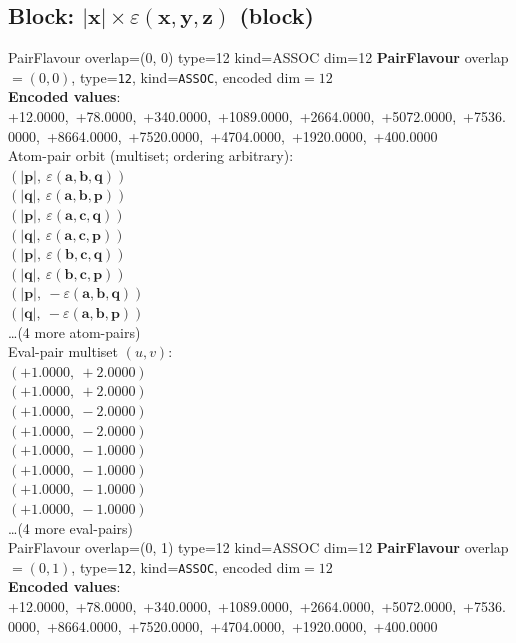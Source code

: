 \documentclass[a4paper,11pt]{article}
\newcommand{\vc}[1]{\ensuremath{\mathbf{#1}}}
\newcommand{\dnfagmiihhiejm}[1]{|\vc{#1}|}
\newcommand{\kblbmcpggoncpf}[3]{\varepsilon(\mathbf{#1},\mathbf{#2},\mathbf{#3})}
\begin{document}
\subsection{Block: $\dnfagmiihhiejm{x} \times \kblbmcpggoncpf{x}{y}{z}$  (block)}
    PairFlavour  overlap=(0, 0)  type=12  kind=ASSOC  dim=12
\textbf{PairFlavour} overlap$=(0, 0)$, type=\texttt{12}, kind=\texttt{ASSOC}, encoded dim$=12$\\
\textbf{      Encoded values}: +12.0000,\ +78.0000,\ +340.0000,\ +1089.0000,\ +2664.0000,\ +5072.0000,\ +7536.0000,\ +8664.0000,\ +7520.0000,\ +4704.0000,\ +1920.0000,\ +400.0000\\
\quad Atom-pair orbit (multiset; ordering arbitrary):\\
$(\dnfagmiihhiejm{p},\ \kblbmcpggoncpf{a}{b}{q})$\\
$(\dnfagmiihhiejm{q},\ \kblbmcpggoncpf{a}{b}{p})$\\
$(\dnfagmiihhiejm{p},\ \kblbmcpggoncpf{a}{c}{q})$\\
$(\dnfagmiihhiejm{q},\ \kblbmcpggoncpf{a}{c}{p})$\\
$(\dnfagmiihhiejm{p},\ \kblbmcpggoncpf{b}{c}{q})$\\
$(\dnfagmiihhiejm{q},\ \kblbmcpggoncpf{b}{c}{p})$\\
$(\dnfagmiihhiejm{p},\ -\kblbmcpggoncpf{a}{b}{q})$\\
$(\dnfagmiihhiejm{q},\ -\kblbmcpggoncpf{a}{b}{p})$\\
\quad \ldots (4 more atom-pairs)\\
\quad Eval-pair multiset $(u, v)$:\\
$(+1.0000,\ +2.0000)$\\
$(+1.0000,\ +2.0000)$\\
$(+1.0000,\ -2.0000)$\\
$(+1.0000,\ -2.0000)$\\
$(+1.0000,\ -1.0000)$\\
$(+1.0000,\ -1.0000)$\\
$(+1.0000,\ -1.0000)$\\
$(+1.0000,\ -1.0000)$\\
\quad \ldots (4 more eval-pairs)\\
    PairFlavour  overlap=(0, 1)  type=12  kind=ASSOC  dim=12
\textbf{PairFlavour} overlap$=(0, 1)$, type=\texttt{12}, kind=\texttt{ASSOC}, encoded dim$=12$\\
\textbf{      Encoded values}: +12.0000,\ +78.0000,\ +340.0000,\ +1089.0000,\ +2664.0000,\ +5072.0000,\ +7536.0000,\ +8664.0000,\ +7520.0000,\ +4704.0000,\ +1920.0000,\ +400.0000\\
\end{document}
